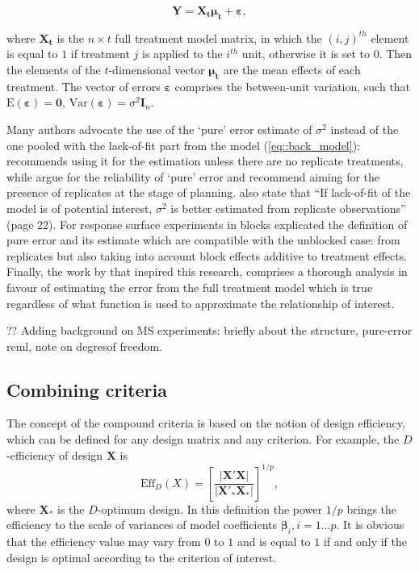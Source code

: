 \documentclass[11pt]{article}
\begin{document}
\begin{equation}
\label{eq::back_trnt}
\bm{Y}=\bm{X_{t}\mu_{t}}+\bm{\varepsilon},
\end{equation} 

where $\bm{X_{t}}$ is the $n\times t$ full treatment model matrix, in which the $(i,j)^{th}$ element is equal to $1$ if treatment $j$ is applied to the $i^{th}$ unit, otherwise it is set to $0$. Then the elements of the $t$-dimensional vector $\bm{\mu_{t}}$ are the mean effects of each treatment. The vector of errors $\bm{\varepsilon}$ comprises the between-unit variation, such that $\mbox{E}(\bm{\varepsilon})=\bm{0}$, $\mbox{Var}(\bm{\varepsilon})=\sigma^2\bm{I}_{n}$.

Many authors advocate the use of the `pure' error estimate of $\sigma^2$ instead of the one pooled with the lack-of-fit part from the model (\ref{eq::back_model}): \cite{Cox1958planning} recommends using it for the estimation unless there are no replicate treatments, while \cite{Draper1998} argue for the reliability of `pure' error and recommend aiming for the presence of replicates at the stage of planning. \cite{Atkinson2007} also state that ``If lack-of-fit of the model is of potential interest, $\sigma^{2}$ is better estimated from replicate observations'' (page 22). For response surface experiments in blocks \cite{Gilmour2000PErsm} explicated the definition of pure error and its estimate which are compatible with the unblocked case: from replicates but also taking into account  block effects additive to treatment effects. Finally, the work by \cite{GilmourTrinca2012} that inspired this research, comprises a thorough analysis in favour of estimating the error from the full treatment model which is true regardless of what function is used to approximate the relationship of interest.

?? Adding background on MS experiments: briefly about the structure, pure-error reml, note on degresof freedom. 

\subsection{Combining criteria}

The concept of the compound criteria is based on the notion of design efficiency, which can be defined for any design matrix and any criterion. For example, the $D$-efficiency of design $\bm{X}$ is
\begin{equation}
\label{eq::D_eff}
\mbox{Eff}_{D}(X)=\left[\frac{\vert \bm{X}'\bm{X}\vert}{\vert \bm{X}'_{*}\bm{X}_{*}\vert}\right]^{1/p},
\end{equation}   
where $\bm{X}_{*}$ is the $D$-optimum design. In this definition the power $1/p$ brings the efficiency to the scale of variances of model coefficients $\bm{\beta}_{i}, i=1\ldots p.$ It is obvious that the efficiency value may vary from $0$ to $1$ and is equal to $1$ if and only if the design is optimal according to the criterion of interest.
\end{document}
